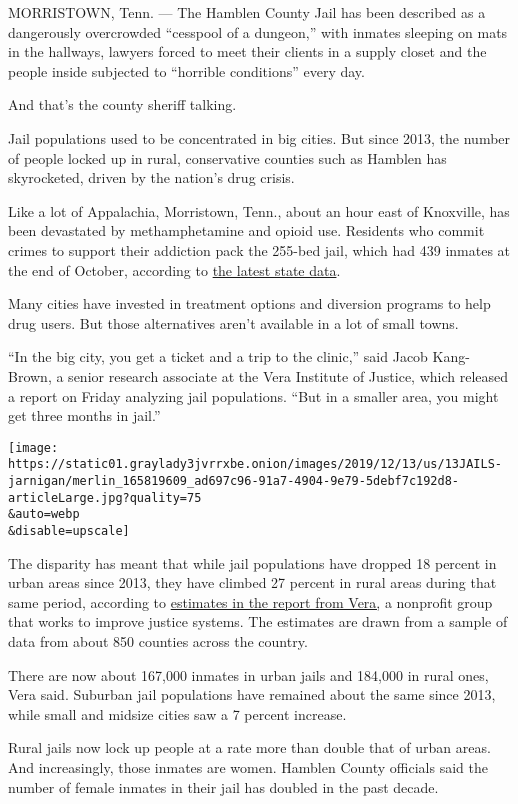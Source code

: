 MORRISTOWN, Tenn. --- The Hamblen County Jail has been described as a
dangerously overcrowded ``cesspool of a dungeon,'' with inmates sleeping
on mats in the hallways, lawyers forced to meet their clients in a
supply closet and the people inside subjected to ``horrible conditions''
every day.

And that's the county sheriff talking.

Jail populations used to be concentrated in big cities. But since 2013,
the number of people locked up in rural, conservative counties such as
Hamblen has skyrocketed, driven by the nation's drug crisis.

Like a lot of Appalachia, Morristown, Tenn., about an hour east of
Knoxville, has been devastated by methamphetamine and opioid use.
Residents who commit crimes to support their addiction pack the 255-bed
jail, which had 439 inmates at the end of October, according to
\href{https://www.tn.gov/content/dam/tn/correction/documents/JailOctober2019.pdf}{the
latest state data}.

Many cities have invested in treatment options and diversion programs to
help drug users. But those alternatives aren't available in a lot of
small towns.

``In the big city, you get a ticket and a trip to the clinic,'' said
Jacob Kang-Brown, a senior research associate at the Vera Institute of
Justice, which released a report on Friday analyzing jail populations.
``But in a smaller area, you might get three months in jail.''

\texttt{[image: https://static01.graylady3jvrrxbe.onion/images/2019/12/13/us/13JAILS-jarnigan/merlin\_165819609\_ad697c96-91a7-4904-9e79-5debf7c192d8-articleLarge.jpg?quality=75\\\&auto=webp\\\&disable=upscale]}

The disparity has meant that while jail populations have dropped 18
percent in urban areas since 2013, they have climbed 27 percent in rural
areas during that same period, according to
\href{https://www.vera.org/publications/people-in-jail-in-2019}{estimates
in the report from Vera,} a nonprofit group that works to improve
justice systems. The estimates are drawn from a sample of data from
about 850 counties across the country.

There are now about 167,000 inmates in urban jails and 184,000 in rural
ones, Vera said. Suburban jail populations have remained about the same
since 2013, while small and midsize cities saw a 7 percent increase.

Rural jails now lock up people at a rate more than double that of urban
areas. And increasingly, those inmates are women. Hamblen County
officials said the number of female inmates in their jail has doubled in
the past decade.

